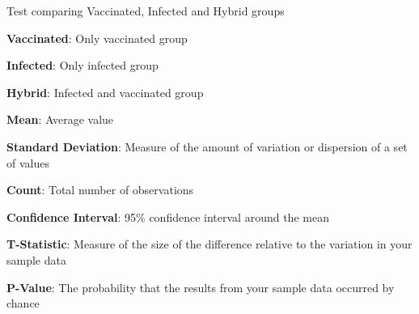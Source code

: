 \documentclass[11pt]{article}
\begin{document}
\begin{table}[h]
\caption{\protect\hyperlink{file-table-1-pkl}{Test of association between vaccination status and symptom numbers}}
\label{table:association_test}
\begin{threeparttable}
\renewcommand{\TPTminimum}{\linewidth}
\begin{tablenotes}
\footnotesize
\item Test comparing Vaccinated, Infected and Hybrid groups
\item \textbf{Vaccinated}: Only vaccinated group
\item \textbf{Infected}: Only infected group
\item \textbf{Hybrid}: Infected and vaccinated group
\item \textbf{Mean}: Average value
\item \textbf{Standard Deviation}: Measure of the amount of variation or dispersion of a set of values
\item \textbf{Count}: Total number of observations
\item \textbf{Confidence Interval}: 95\% confidence interval around the mean
\item \textbf{T-Statistic}: Measure of the size of the difference relative to the variation in your sample data
\item \textbf{P-Value}: The probability that the results from your sample data occurred by chance
\end{tablenotes}
\end{threeparttable}
\end{table}
\end{document}
